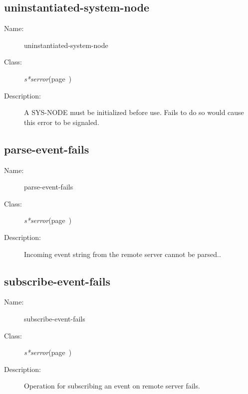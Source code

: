 \subsection{uninstantiated-system-node}
\label{uninstantiated-system-node}

\begin{description}
\item [Name:]  uninstantiated-system-node

\item [Class:]
{\sl s*serror}\hfill(page~\pageref{s*serror})


\item [Description:] 
A SYS-NODE must be initialized before use. Fails to do so
would cause this error to be signaled.



\end{description}
\horizontalline

\subsection{parse-event-fails}
\label{parse-event-fails}

\begin{description}
\item [Name:]  parse-event-fails


\item [Class:]
{\sl s*serror}\hfill(page~\pageref{s*serror})


\item [Description:]
Incoming event string from the remote server cannot be
parsed.. 


\end{description}
\horizontalline

\subsection{subscribe-event-fails}
\label{subscribe-event-fails}

\begin{description}
\item [Name:]  subscribe-event-fails


\item [Class:]
{\sl s*serror}\hfill(page~\pageref{s*serror})


\item [Description:]
Operation for subscribing an event on remote server fails. 

\end{description}
\horizontalline

